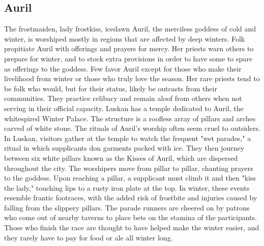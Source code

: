 \documentclass[10pt,a4paper,twoside,twocolumn,openany,bg=print,nodeprecatedcode]{dndbook}
\begin{document}
\subsection{Auril}
The frostmaiden, lady frostkiss, icedawn
Auril, the merciless goddess of cold and winter, is worshiped mostly in regions that are affected by deep winters. Folk propitiate Auril with offerings and prayers for mercy. Her priests warn others to prepare for winter, and to stock extra provisions in order to have some to spare as offerings to the goddess.
Few favor Auril except for those who make their livelihood from winter or those who truly love the season. Her rare priests tend to be folk who would, but for their status, likely be outcasts from their communities. They practice celibacy and remain aloof from others when not serving in their official capacity.
Luskan has a temple dedicated to Auril, the whitespired Winter Palace. The structure is a roofless array of pillars and arches carved of white stone. The rituals of Auril's worship often seem cruel to outsiders. In Luskan, visitors gather at the temple to watch the frequent "wet parades," a ritual in which supplicants don garments packed with ice. They then journey between six white pillars known as the Kisses of Auril, which are dispersed throughout the city. The worshipers move from pillar to pillar, chanting prayers to the goddess. Upon reaching a pillar, a supplicant must climb it and then "kiss the lady," touching lips to a rusty iron plate at the top. In winter, these events resemble frantic footraces, with the added risk of frostbite and injuries caused by falling from the slippery pillars. The parade runners are cheered on by patrons who come out of nearby taverns to place bets on the stamina of the participants. Those who finish the race are thought to have helped make the winter easier, and they rarely have to pay for food or ale all winter long.
\end{document}
